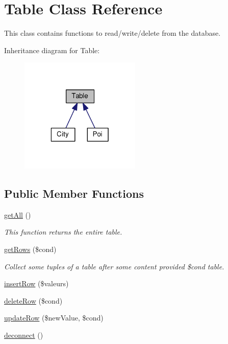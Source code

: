 \hypertarget{class_table}{\section{Table Class Reference}
\label{class_table}
}


This class contains functions to read/write/delete from the database.  




Inheritance diagram for Table\-:\nopagebreak
\begin{figure}[H]
\begin{center}
\leavevmode
\includegraphics[width=163pt]{class_table__inherit__graph}
\end{center}
\end{figure}
\subsection*{Public Member Functions}
\begin{DoxyCompactItemize}
\item 
\hyperlink{class_table_aba0d5b303383fb5b1fabb5fd01cd3800}{get\-All} ()
\begin{DoxyCompactList}\small\item\em This function returns the entire table. \end{DoxyCompactList}\item 
\hyperlink{class_table_a2f4379fc75908df9538e80a8a7f1043a}{get\-Rows} (\$cond)
\begin{DoxyCompactList}\small\item\em Collect some tuples of a table after some content provided \$cond table. \end{DoxyCompactList}\item 
\hyperlink{class_table_a60590b38a52542f17a63f5211ba3a111}{insert\-Row} (\$valeurs)
\item 
\hyperlink{class_table_a9d23647d9285ae7c3066280c9ad2bf9f}{delete\-Row} (\$cond)
\item 
\hyperlink{class_table_a3ee38d1ab83f5834b5ffeae8daad85f8}{update\-Row} (\$new\-Value, \$cond)
\item 
\hyperlink{class_table_a8a406dace7e7ab080d58066e627c6465}{deconnect} ()
\end{DoxyCompactItemize}
